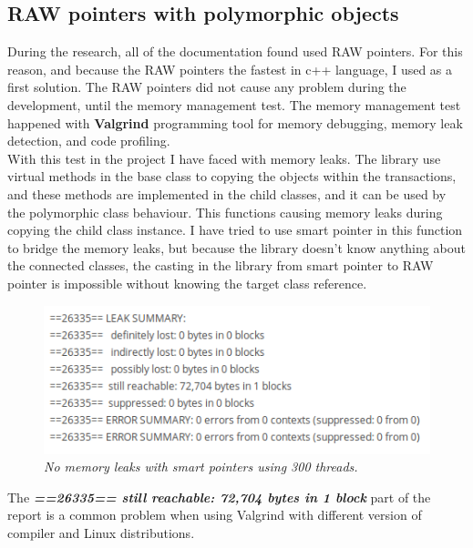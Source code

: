 \documentclass[12pt]{article}
\begin{document}
\subsection{RAW pointers with polymorphic objects}
During the research, all of the documentation found used RAW pointers. For this reason, and because the RAW pointers the fastest in c++ language, I used as a first solution. The RAW pointers did not cause any problem during the development, until the memory management test. The memory management test happened with \textbf{Valgrind} programming tool for memory debugging, memory leak detection, and code profiling.\\

With this test in the project I have faced with memory leaks. The library use virtual methods in the base class to copying the objects within the transactions, and these methods are implemented in the child classes, and it can be used by the polymorphic class behaviour. This functions causing memory leaks during copying the child class instance. I have tried to use smart pointer in this function to bridge the memory leaks, but because the library doesn't know anything about the connected classes, the casting in the library from smart pointer to RAW pointer is impossible without knowing the target class reference.

\begin{figure}[h!]
\centering
\includegraphics[scale=0.7]{Pictures/memory.png}
\caption*{\textit{\color{gray}No memory leaks with smart pointers using 300 threads.}}
\end{figure}

The \textbf{\textit{==26335==  still reachable: 72,704 bytes in 1 block}} part of the report is a common problem when using Valgrind with different version of compiler and Linux distributions. 
\end{document}

